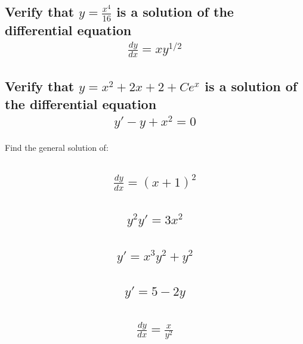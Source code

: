 \documentclass{article}
\begin{document}
\subsection{Verify that $y = \frac{x^4}{16}$ is a solution of the differential equation
	\begin{align*}
		\frac{dy}{dx} = xy^{1/2}
	\end{align*}
}

\subsection{Verify that $y = x^2 + 2x + 2 + Ce^x$ is a solution of the differential equation
	\begin{align*}
		y' - y + x^2 = 0
	\end{align*}
}

Find the general solution of:
\subsection{
	\begin{align*}
		\frac{dy}{dx} = (x + 1)^2
	\end{align*}
}

\subsection{
	\begin{align*}
		y^2 y' = 3x^2
	\end{align*}
}

\subsection{
	\begin{align*}
		y' = x^3y^2 + y^2
	\end{align*}
}

\subsection{
	\begin{align*}
		y' = 5 - 2y
	\end{align*}
}

\subsection{
	\begin{align*}
		\frac{dy}{dx} = \frac{x}{y^2}
	\end{align*}
}
\end{document}
